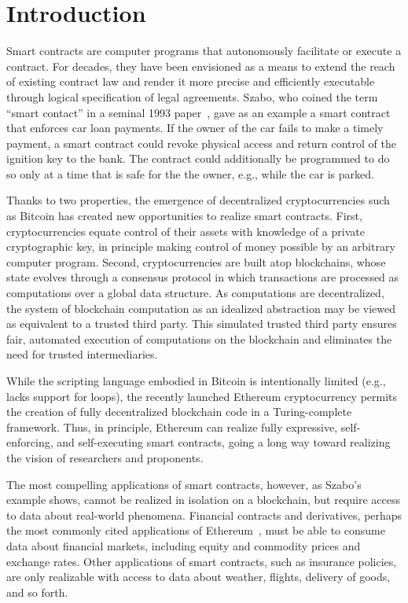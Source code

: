 \section{Introduction}

Smart contracts are computer programs that autonomously facilitate or execute a contract. For decades, they have been envisioned as a means to extend the reach of existing contract law and render it more precise and efficiently executable through logical specification of legal agreements. Szabo, who coined the term ``smart contact'' in a seminal 1993 paper~\cite{}, gave as an example a smart contract that enforces car loan payments. If the owner of the car fails to make a timely payment, a smart contract could revoke physical access and return control of the ignition key to the bank. The contract could additionally be programmed to do so only at a time that is safe for the the owner, e.g., while the car is parked.

Thanks to two properties, the emergence of decentralized cryptocurrencies such as Bitcoin has created new opportunities to realize smart contracts. First, cryptocurrencies equate control of their assets with knowledge of a private cryptographic key, in principle making control of money possible by an arbitrary computer program. Second, cryptocurrencies are built atop blockchains, whose state evolves through a consensus protocol in which transactions are processed as computations over a global data structure. As computations are decentralized, the system of blockchain computation as an idealized abstraction may be viewed as equivalent to a trusted third party. This simulated trusted third party ensures fair, automated execution of computations on the blockchain and eliminates the need for trusted intermediaries. 

While the scripting language embodied in Bitcoin is intentionally limited (e.g., lacks support for loops), the recently launched Ethereum cryptocurrency permits the creation of fully decentralized blockchain code in a Turing-complete framework. Thus, in principle, Ethereum can realize fully expressive, self-enforcing, and self-executing smart contracts, going a long way toward realizing the vision of researchers and proponents.  

The most compelling applications of smart contracts, however, as Szabo's example shows, cannot be realized in isolation on a blockchain, but require access to data about real-world phenomena. Financial contracts and derivatives, perhaps the most commonly cited applications of Ethereum~\cite{}, must be able to consume data about financial markets, including equity and commodity prices and exchange rates. Other applications of smart contracts, such as insurance policies, are only realizable with access to data about weather, flights, delivery of goods, and so forth. 


